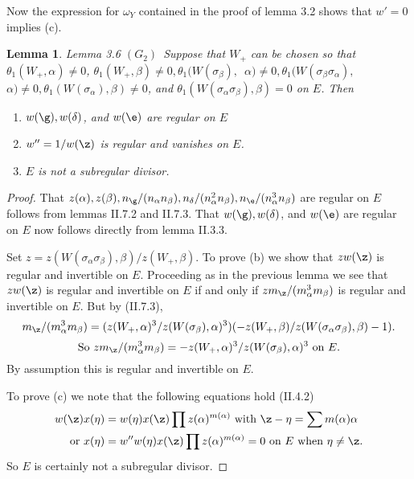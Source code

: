 \documentclass{memo-l}
\newtheorem{lemma}[theorem]{Lemma}
\theoremstyle{definition}
\theoremstyle{remark}
\numberwithin{section}{chapter}
\numberwithin{equation}{chapter}
\begin{document}
   Now the expression for ${\omega}_{Y}$ contained in the proof of lemma 3.2 
shows that $w' = 0$ implies (c).


{\medskip}

\begin{lemma}{Lemma 3.6}   $(G_{2})$\  Suppose that $W_{+}$ can be chosen so that 
${\theta}_{1}(W_{+},{\alpha})\ne 0$, ${\theta}_{1}(W_{+},{\beta})\ne 0, 
{\theta}_{1}(W({\sigma}_{\beta}),$\ ${\alpha})\ne 0, {\theta}_{1}
(W({\sigma}_{\beta}{\sigma}_{\alpha}),$\ ${\alpha})\ne 0, 
{\theta}_{1}(W({\sigma}_{\alpha}),{\beta})\ne 0$, and 
${\theta}_{1}(W({\sigma}_{\alpha}{\sigma}_{\beta}),{\beta}) = 0$ on $E$. 
 Then

\noindent
\begin{enumerate}[label=\alph*)]
\item $w({\g}), w({\delta})$, and $w({\e})$ are regular on $E$
\item $w'' = 1/w({\z})$ is regular and vanishes on $E$.
\item $E$ is not a subregular divisor.
\end{enumerate}
\end{lemma}

\medskip

\begin{proof}    That $z({\alpha}), z({\beta}), n_{{\g}}/(n_{\alpha}
n_{\beta}), n_{{\delta}}/(n_{\alpha}^{2}n_{\beta}), 
n_{{\e}}/(n_{\alpha}^{3}n_{\beta})$ are regular on $E$ follows 
from lemmas II.7.2 and II.7.3. 
 That $w({\g}), w({\delta})$, and $w({\e})$ are regular on $E$ now 
follows directly from lemma II.3.3. 
 

   Set $z = z(W({\sigma}_{\alpha}{\sigma}_{\beta}),{\beta})/z(W_{+},{\beta})$. 
 To prove (b) we show that $zw({\z})$ is regular and invertible on $E$. 
 Proceeding as in the previous lemma we see that $zw({\z})$ is regular and 
invertible on $E$ if and only if $zm_{{\z}}/(m_{\alpha}^{3}m_{\beta})$ 
is regular and invertible on $E$. 
 But by (II.7.3),
$$
m_{{\z}}/(m_{\alpha}^{3}m_{\beta}) = 
(z(W_{+},{\alpha})^{3}/z(W({\sigma}_{\beta}),{\alpha})^{3})
(-z(W_{+},{\beta})/z(W({\sigma}_{\alpha}{\sigma}_{\beta}),{\beta}) - 1).
$$
$$
{\text{So}}\ zm_{{\z}}/(m_{\alpha}^{3}m_{\beta}) = 
-z(W_{+},{\alpha})^{3}/z(W({\sigma}_{\beta}),{\alpha})^{3}\ 
{\text{on}}\  E.
$$
By assumption this is regular and invertible on $E$.

   To prove (c) we note that the following equations hold (II.4.2)
$$
\aligned
w({\z})x({\eta}) &= w({\eta})x({\z}) \prod
z({\alpha})^{m({\alpha})}\  {\text{with}}\  {\z}-{\eta} = 
\sum m({\alpha}){\alpha} \\
{\text{or}}\  x({\eta}) &= w''w({\eta})x({\z}) \prod
z({\alpha})^{m({\alpha})} = 0\ {\text{on}}\ E\ {\text{when}}\ {\eta}\ne {\z}.
\endaligned
$$
So $E$ is certainly not a subregular divisor.
\end{proof}
\end{document}
